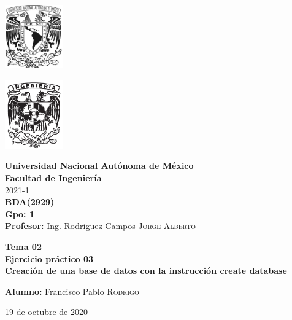 \documentclass{article}
\newcommand{\materia}{BDA}
\newcommand{\clave}{2929}
\newcommand{\profesor}{Ing. Rodriguez Campos \textsc{Jorge Alberto}}
\newcommand{\semestre}{2021-1}
\newcommand{\alumno}{Francisco Pablo \textsc{Rodrigo}}
\newcommand{\actividad}{Tema 02 \\ Ejercicio práctico 03}
\newcommand{\titulo}{Creación de una base de datos con la instrucción 
create database}
\newcommand{\fechaEntrega}{19 de octubre de 2020}
\begin{document}
\thispagestyle{empty}
\begin{minipage}[t][5cm][t]{0.2\linewidth}
    \includegraphics[width=2.5cm]{unam.jpg}
    \vspace{10cm}

    \includegraphics[width=2.5cm]{fiblack}
\end{minipage}
\begin{minipage}[t]{0.7\linewidth}
    \vspace{-2.5cm}
    \LARGE{\textbf{Universidad Nacional Autónoma de México}}\\
    \Large{\textbf{Facultad de Ingeniería}} \\

    \large{\semestre}\\[2cm]

    \large{\textbf{\materia (\clave)}}\\
    \large{\textbf{Gpo: 1}}\\[5mm]
    \large{\textbf{Profesor:} \profesor}\\ [1.5cm]
    \begin{center}
        \LARGE{\textbf{\actividad}}\\
        \LARGE{\textbf{\titulo}}\\
    \end{center}

    \vspace{3.3cm}

    \large{\textbf{Alumno:} \alumno} \\[1.5cm]

    \begin{flushright}
        \fechaEntrega%
    \end{flushright}
\end{minipage}

\newpage
\end{document}
